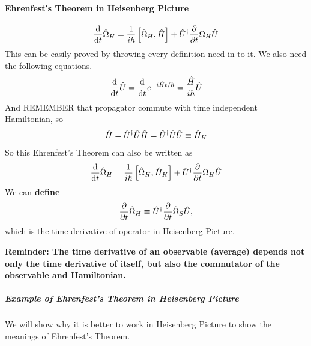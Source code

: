 \documentclass[letterpaper,10pt,english]{sphinxmanual}
\def\d{{\rm d}}
\begin{document}
\paragraph{Ehrenfest's Theorem in Heisenberg Picture}
\label{Quantum/QuantumMechanics:ehrenfest-s-theorem-in-heisenberg-picture}\begin{gather}
\begin{split}\frac{\d }{\d t} \hat \Omega _ H = \frac{1}{i\hbar } \left[ \hat \Omega _ H, \hat H \right] + \hat U ^ \dagger \frac{\partial }{\partial t} \Omega _ H \hat U\end{split}\notag
\end{gather}
This can be easily proved by throwing every definition need in to it. We also need the following equations.
\begin{gather}
\begin{split}\frac{\d }{\d t} \hat U = \frac{\d }{\d t} e^{-i\hat H t /\hbar} = \frac{\hat H}{i\hbar} \hat U\end{split}\notag
\end{gather}
And REMEMBER that propagator commute with time independent Hamiltonian, so
\begin{gather}
\begin{split}\hat H = \hat U^\dagger \hat U \hat H = \hat U^ \dagger \hat U \hat U \equiv \hat H _ H\end{split}\notag
\end{gather}
So this Ehrenfest's Theorem can also be written as
\begin{gather}
\begin{split}\frac{\d }{\d t} \hat \Omega _ H = \frac{1}{i\hbar } \left[ \hat \Omega _ H, \hat H _ H \right] + \hat U ^ \dagger \frac{\partial }{\partial t} \Omega _ H \hat U\end{split}\notag
\end{gather}
We can \textbf{define}
\begin{gather}
\begin{split}\frac{\partial}{\partial t}\hat  \Omega _ H \equiv \hat U^\dagger  \frac{\partial }{\partial t}\hat  \Omega _ S \hat U  ,\end{split}\notag
\end{gather}
which is the time derivative of operator in Heisenberg Picture.

\textbf{Reminder: The time derivative of an observable (average) depends not only the time derivative of itself, but also the commutator of the observable and Hamiltonian.}


\subparagraph{Example of Ehrenfest's Theorem in Heisenberg Picture}
\label{Quantum/QuantumMechanics:example-of-ehrenfest-s-theorem-in-heisenberg-picture}
We will show why it is better to work in Heisenberg Picture to show the meanings of Ehrenfest's Theorem.
\end{document}
